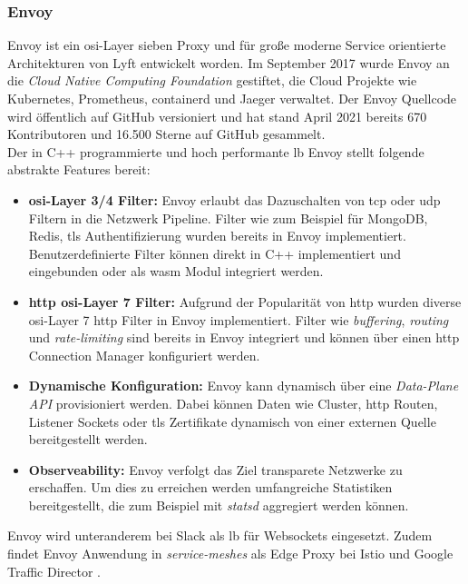 \subsubsection{Envoy} \label{s:envoy}
Envoy ist ein \ac{osi}-Layer sieben Proxy und für gro{\ss}e moderne Service orientierte Architekturen von Lyft entwickelt worden.
Im September 2017 wurde Envoy an die \textit{Cloud Native Computing Foundation} gestiftet, die Cloud Projekte wie Kubernetes, Prometheus, containerd und Jaeger verwaltet.
Der Envoy Quellcode wird öffentlich auf GitHub versioniert und hat stand April 2021 bereits 670 Kontributoren und 16.500 Sterne auf GitHub gesammelt. \cite{EnvoyproxyEnvoy2021}
\\
Der in C++ programmierte und hoch performante \ac{lb} Envoy stellt folgende abstrakte Features bereit:
\begin{itemize}
    \item \textbf{\acs{osi}-Layer 3/4 Filter:} Envoy erlaubt das Dazuschalten von \acs{tcp} oder \acs{udp} Filtern in die Netzwerk Pipeline. Filter wie zum Beispiel für MongoDB, Redis, \ac{tls} Authentifizierung wurden bereits in Envoy implementiert. Benutzerdefinierte Filter können direkt in C++ implementiert und eingebunden oder als \ac{wasm} Modul integriert werden.
      \cite{WhatEnvoyEnvoy}
    \item \textbf{\acs{http} \ac{osi}-Layer 7 Filter:} Aufgrund der Popularität von \ac{http} wurden diverse \ac{osi}-Layer 7 \ac{http} Filter in Envoy implementiert. Filter wie \textit{buffering}, \textit{routing} und \textit{rate-limiting} sind bereits in Envoy integriert und können über einen \ac{http} Connection Manager konfiguriert werden.
      \cite{WhatEnvoyEnvoy}
    \item \textbf{Dynamische Konfiguration:} Envoy kann dynamisch über eine \textit{Data-Plane API} provisioniert werden. Dabei können Daten wie Cluster, \ac{http} Routen, Listener Sockets oder \ac{tls} Zertifikate dynamisch von einer externen Quelle bereitgestellt werden.
      \cite{WhatEnvoyEnvoy}
    \item \textbf{Observeability:} Envoy verfolgt das Ziel transparete Netzwerke zu erschaffen. Um dies zu erreichen werden umfangreiche Statistiken bereitgestellt, die zum Beispiel mit \textit{statsd} aggregiert werden können.
      \cite{WhatEnvoyEnvoy}
\end{itemize}
Envoy wird unteranderem bei Slack \cite{MigratingMillionsConcurrent2021} als \acl{lb} für Websockets eingesetzt. Zudem findet Envoy Anwendung in \textit{service-meshes} als Edge Proxy bei Istio \cite{Istio} und Google Traffic Director \cite{TrafficDirectorGoogle}.

\newpage
